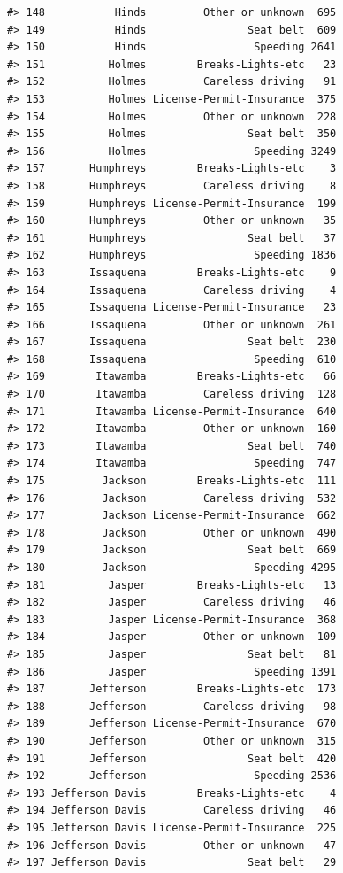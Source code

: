 \documentclass[
]{book}
\begin{document}
\begin{verbatim}
#> 148           Hinds         Other or unknown  695
#> 149           Hinds                Seat belt  609
#> 150           Hinds                 Speeding 2641
#> 151          Holmes        Breaks-Lights-etc   23
#> 152          Holmes         Careless driving   91
#> 153          Holmes License-Permit-Insurance  375
#> 154          Holmes         Other or unknown  228
#> 155          Holmes                Seat belt  350
#> 156          Holmes                 Speeding 3249
#> 157       Humphreys        Breaks-Lights-etc    3
#> 158       Humphreys         Careless driving    8
#> 159       Humphreys License-Permit-Insurance  199
#> 160       Humphreys         Other or unknown   35
#> 161       Humphreys                Seat belt   37
#> 162       Humphreys                 Speeding 1836
#> 163       Issaquena        Breaks-Lights-etc    9
#> 164       Issaquena         Careless driving    4
#> 165       Issaquena License-Permit-Insurance   23
#> 166       Issaquena         Other or unknown  261
#> 167       Issaquena                Seat belt  230
#> 168       Issaquena                 Speeding  610
#> 169        Itawamba        Breaks-Lights-etc   66
#> 170        Itawamba         Careless driving  128
#> 171        Itawamba License-Permit-Insurance  640
#> 172        Itawamba         Other or unknown  160
#> 173        Itawamba                Seat belt  740
#> 174        Itawamba                 Speeding  747
#> 175         Jackson        Breaks-Lights-etc  111
#> 176         Jackson         Careless driving  532
#> 177         Jackson License-Permit-Insurance  662
#> 178         Jackson         Other or unknown  490
#> 179         Jackson                Seat belt  669
#> 180         Jackson                 Speeding 4295
#> 181          Jasper        Breaks-Lights-etc   13
#> 182          Jasper         Careless driving   46
#> 183          Jasper License-Permit-Insurance  368
#> 184          Jasper         Other or unknown  109
#> 185          Jasper                Seat belt   81
#> 186          Jasper                 Speeding 1391
#> 187       Jefferson        Breaks-Lights-etc  173
#> 188       Jefferson         Careless driving   98
#> 189       Jefferson License-Permit-Insurance  670
#> 190       Jefferson         Other or unknown  315
#> 191       Jefferson                Seat belt  420
#> 192       Jefferson                 Speeding 2536
#> 193 Jefferson Davis        Breaks-Lights-etc    4
#> 194 Jefferson Davis         Careless driving   46
#> 195 Jefferson Davis License-Permit-Insurance  225
#> 196 Jefferson Davis         Other or unknown   47
#> 197 Jefferson Davis                Seat belt   29

\end{verbatim}
\end{document}
